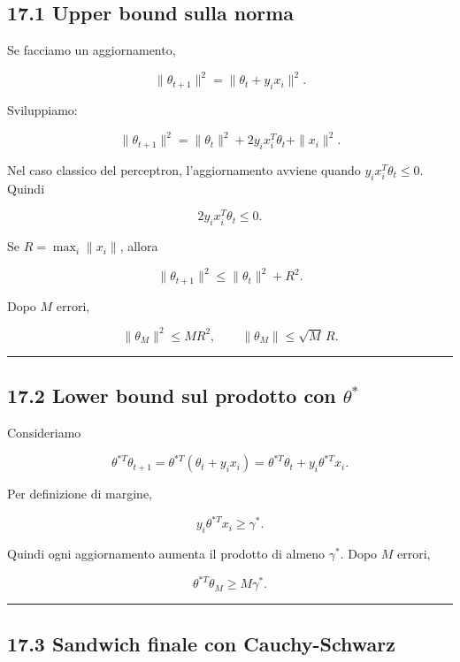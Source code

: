 \documentclass[
]{article}
\begin{document}
\subsection{17.1 Upper bound sulla norma}\label{upper-bound-sulla-norma}

Se facciamo un aggiornamento,

\[
\|\theta_{t+1}\|^2
=
\|\theta_t + y_i x_i\|^2.
\]

Sviluppiamo:

\[
\|\theta_{t+1}\|^2
=
\|\theta_t\|^2 + 2y_i x_i^T\theta_t + \|x_i\|^2.
\]

Nel caso classico del perceptron, l'aggiornamento avviene quando
\(y_ix_i^T\theta_t\le 0\). Quindi

\[
2y_i x_i^T\theta_t \le 0.
\]

Se \(R=\max_i \|x_i\|\), allora

\[
\|\theta_{t+1}\|^2 \le \|\theta_t\|^2 + R^2.
\]

Dopo \(M\) errori,

\[
\|\theta_M\|^2 \le M R^2,
\qquad
\|\theta_M\|\le \sqrt{M}\,R.
\]

\begin{center}\rule{0.5\linewidth}{0.5pt}\end{center}

\subsection{\texorpdfstring{17.2 Lower bound sul prodotto con
\(\theta^*\)}{17.2 Lower bound sul prodotto con \textbackslash theta\^{}*}}\label{lower-bound-sul-prodotto-con-theta}

Consideriamo

\[
\theta^{*T}\theta_{t+1}
=
\theta^{*T}(\theta_t+y_ix_i)
=
\theta^{*T}\theta_t + y_i\theta^{*T}x_i.
\]

Per definizione di margine,

\[
y_i\theta^{*T}x_i \ge \gamma^*.
\]

Quindi ogni aggiornamento aumenta il prodotto di almeno \(\gamma^*\).
Dopo \(M\) errori,

\[
\theta^{*T}\theta_M \ge M\gamma^*.
\]

\begin{center}\rule{0.5\linewidth}{0.5pt}\end{center}

\subsection{17.3 Sandwich finale con
Cauchy-Schwarz}\label{sandwich-finale-con-cauchy-schwarz}
\end{document}
